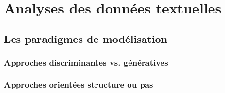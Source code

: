 




\section{Analyses des données textuelles}
\label{sec:literature:legaltal}



\subsection{Les paradigmes de modélisation}

\subsubsection{Approches discriminantes vs. génératives}

\subsubsection{Approches orientées structure ou pas}




